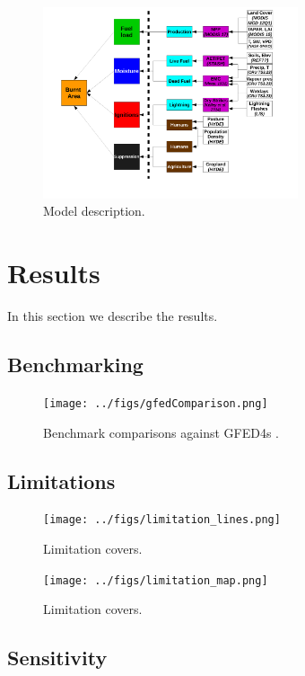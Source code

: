 \documentclass[12pt]{article}
\begin{document}
\begin{figure}[!ht]
  \centering
    \includegraphics[width=0.67\textwidth]{Model_schematic.pdf}

  \caption{Model description.}
\end{figure}


\section{Results}\label{results}
In this section we describe the results.

\subsection{Benchmarking}

\begin{figure}[!ht]
  \centering
    \texttt{[image: ../figs/gfedComparison.png]}
  \caption{Benchmark comparisons against GFED4s \citep{Giglio2013}.}
\end{figure}

\subsection{Limitations}

\begin{figure}[!ht]
  \centering
    \texttt{[image: ../figs/limitation\_lines.png]}

  \caption{Limitation covers.}
\end{figure}

\begin{figure}[!ht]
  \centering
    \texttt{[image: ../figs/limitation\_map.png]}

  \caption{Limitation covers.}
\end{figure}

\subsection{Sensitivity}
\end{document}
